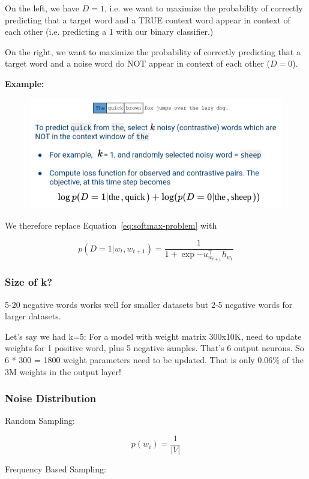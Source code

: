 \documentclass[11pt]{article}
\begin{document}
On the left, we have $D=1$, i.e. we want to maximize the probability of correctly predicting that a target word and a TRUE context word appear in context of each other (i.e. predicting a 1 with our binary classifier.)

On the right, we want to maximize the probability of correctly predicting that a target word and a noise word do NOT appear in context of each other ($D=0$).

\textbf{Example:}

\begin{figure}[H]
    \centering
    \includegraphics*[width=.5\linewidth]{figures/skip-gram-negative-sampling-example.png}
\end{figure}

We therefore replace Equation~\ref{eq:softmax-problem} with

\begin{equation}
    p(D=1|w_t, w_{t+1}) = \frac{1}{1 + \exp{-u_{w_{t+1}}^\top h_{w_t}}}\label{eq:sigmoid}
\end{equation}

\subsubsection{Size of k?}

5-20 negative words works well for smaller datasets but 2-5 negative words for larger datasets.

Let's say we had k=5: For a model with weight matrix 300x10K, need to update weights for 1 positive word, plus 5 negative samples. That's 6 output neurons. So 6 * 300 = 1800 weight parameters need to be updated. That is only 0.06\% of the 3M weights in the output layer!

\subsubsection{Noise Distribution}

Random Sampling:

\begin{equation*}
    p(w_i) = \frac 1 {|V|}
\end{equation*}

Frequency Based Sampling:
\end{document}
